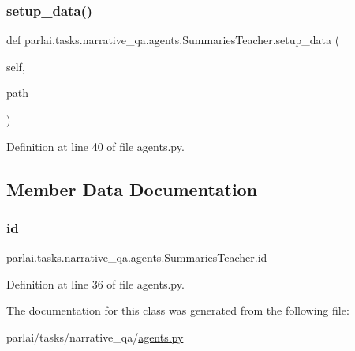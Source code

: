 \subsubsection{\texorpdfstring{setup\+\_\+data()}{setup\_data()}}
{\footnotesize\ttfamily def parlai.\+tasks.\+narrative\+\_\+qa.\+agents.\+Summaries\+Teacher.\+setup\+\_\+data (\begin{DoxyParamCaption}\item[{}]{self,  }\item[{}]{path }\end{DoxyParamCaption})}



Definition at line 40 of file agents.\+py.



\subsection{Member Data Documentation}
\mbox{\label{classparlai_1_1tasks_1_1narrative__qa_1_1agents_1_1SummariesTeacher_a00d240ba5d5d8c7ba0257dbbbc2ba58c}} 
\subsubsection{\texorpdfstring{id}{id}}
{\footnotesize\ttfamily parlai.\+tasks.\+narrative\+\_\+qa.\+agents.\+Summaries\+Teacher.\+id}



Definition at line 36 of file agents.\+py.



The documentation for this class was generated from the following file\+:\begin{DoxyCompactItemize}
\item 
parlai/tasks/narrative\+\_\+qa/\hyperlink{parlai_2tasks_2narrative__qa_2agents_8py}{agents.\+py}\end{DoxyCompactItemize}
